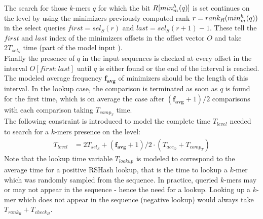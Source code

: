\documentclass[a4paper,titlepage,onecolumn,oneside,12pt,nenglish,titlepage=firstiscover]{scrbook}
\theoremstyle{plain} %
\theoremstyle{definition} %
\theoremstyle{remark} %
\theoremstyle{plain}
\newcommand{\kmer}{q}
\newcommand{\access}{acc}
\newcommand{\contains}{rank}
\newcommand{\rank}{rank}
\newcommand{\select}{sel}
\newcommand{\compare}{comp}
\newcommand{\timeForOperationOnStructure}[2]{T_{#1_{#2}}} %
\newcommand{\varAverageFrequency}{\textbf{f}_{\textbf{avg}}}
\begin{document}
The search for those $k$-mers $\kmer$ for which the bit $R[\minimizerOf{\kmer}{}]$ is set continues on the level by using the minimizers previously computed rank  $r = \rank_R(\minimizerOf{\kmer}{})$ in the select queries $first = \select_S(r)$ and $last = \select_S(r+1)-1$. These tell the $first$ and $last$ index of the minimizers offsets in the offset vector $O$ and take $2\timeForOperationOnStructure{\select}{S}$ time (part of the model input ).\\
Finally the presence of $\kmer$ in the input sequences is checked at every offset in the interval $O[first:last]$ until $\kmer$ is either found or the end of the interval is reached. The modeled average frequency $\varAverageFrequency$ of \infrequent minimizers should be the length of this interval. In the lookup case, the comparison is terminated as soon as $\kmer$ is found for the first time, which is on average the case after $(\varAverageFrequency+1)/2$ comparisons with each comparison taking $\timeForOperationOnStructure{\compare}{T}$ time.\\
The following constraint is introduced to model the complete time $\timeForOperationOnStructure{level}{}$ needed to search for a $k$-mers presence on the level:
\newcommand{\levelTime}{\timeForOperationOnStructure{level}{} &= 2\timeForOperationOnStructure{\select}{S} + (\varAverageFrequency+1)/2 \cdot (\timeForOperationOnStructure{\access}{O} + \timeForOperationOnStructure{\compare}{T})}
\begin{align}
	\levelTime \label{constraint:levelTime}
\end{align}
Note that the lookup time variable $\timeForOperationOnStructure{lookup}{}$ is modeled to correspond to the average time for a positive RSHash lookup, that is the time to lookup a $k$-mer which was randomly sampled from the sequence. In practice, queried $k$-mers may or may not appear in the sequence - hence the need for a lookup. Looking up a $k$-mer which does not appear in the sequence (negative lookup) would always take $\timeForOperationOnStructure{\contains}{R} + \timeForOperationOnStructure{check}{H}$.\\
\end{document}
